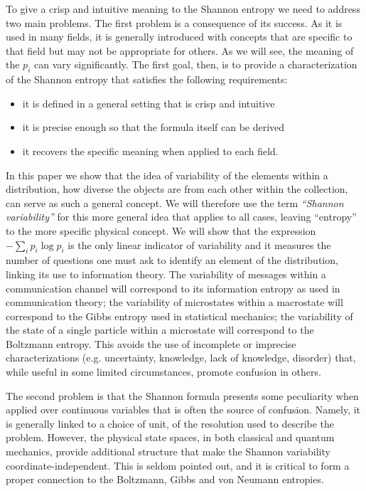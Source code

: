 \documentclass[iopart]{revtex4-1}
\begin{document}
To give a crisp and intuitive meaning to the Shannon entropy we need to address two main problems. The first problem is a consequence of its success. As it is used in many fields, it is generally introduced with concepts that are specific to that field but may not be appropriate for others. As we will see, the meaning of the $p_i$ can vary significantly. The first goal, then, is to provide a characterization of the Shannon entropy that satisfies the following requirements:
\begin{itemize}
	\item it is defined in a general setting that is crisp and intuitive
	\item it is precise enough so that the formula itself can be derived
	\item it recovers the specific meaning when applied to each field.
\end{itemize}
In this paper we show that the idea of variability of the elements within a distribution, how diverse the objects are from each other within the collection, can serve as such a general concept. We will therefore use the term \emph{``Shannon variability''} for this more general idea that applies to all cases, leaving ``entropy'' to the more specific physical concept. We will show that the expression $- \sum_i p_i \log p_i$ is the only linear indicator of variability and it measures the number of questions one must ask to identify an element of the distribution, linking its use to information theory. The variability of messages within a communication channel will correspond to its information entropy as used in communication theory; the variability of microstates within a macrostate will correspond to the Gibbs entropy used in statistical mechanics; the variability of the state of a single particle within a microstate will correspond to the Boltzmann entropy. This avoids the use of incomplete or imprecise characterizations (e.g. uncertainty, knowledge, lack of knowledge, disorder) that, while useful in some limited circumstances, promote confusion in others.

The second problem is that the Shannon formula presents some peculiarity when applied over continuous variables that is often the source of confusion. Namely, it is generally linked to a choice of unit, of the resolution used to describe the problem. However, the physical state spaces, in both classical and quantum mechanics, provide additional structure that make the Shannon variability coordinate-independent. This is seldom pointed out, and it is critical to form a proper connection to the Boltzmann, Gibbs and von Neumann entropies.
\end{document}
